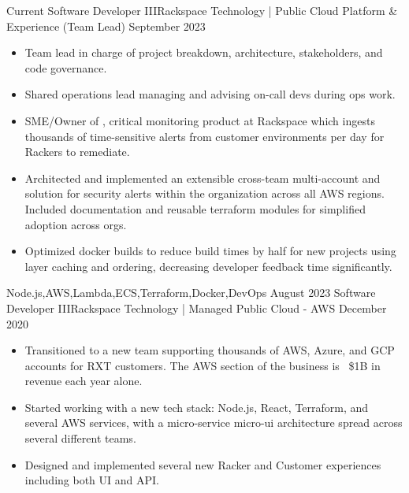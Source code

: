 \begin{experiences}
  \experience
    {Current}       {Software Developer III}{Rackspace Technology | Public Cloud Platform \& Experience (Team Lead)}
    {September 2023}{
                      \begin{itemize}
                        \item Team lead in charge of project breakdown, architecture, stakeholders, and code governance.
                        \item Shared operations lead managing and advising on-call devs during ops work.
                        \item SME/Owner of , critical monitoring product at Rackspace which ingests thousands of time-sensitive alerts from customer environments per day for Rackers to remediate.
                        \item Architected and implemented an extensible cross-team multi-account  and  solution for security alerts within the organization across all AWS regions. Included documentation and reusable terraform modules for simplified adoption across orgs.
                        \ifcv
                        \item Optimized docker builds to reduce build times by half for new projects using layer caching and ordering, decreasing developer feedback time significantly.
                        \fi
                      \end{itemize}
                    }
                    {Node.js,AWS,Lambda,ECS,Terraform,Docker,DevOps}
  \emptySeparator
  \experience
    {August 2023}   {Software Developer III}{Rackspace Technology | Managed Public Cloud - AWS}
    {December 2020} {
                      \begin{itemize}
                        \item Transitioned to a new team supporting thousands of AWS, Azure, and GCP accounts for RXT customers. The AWS section of the business is ~\$1B in revenue each year alone.
                        \item Started working with a new tech stack: Node.js, React, Terraform, and several AWS services, with a micro-service micro-ui architecture spread across several different teams.
                        \item Designed and implemented several new Racker and Customer experiences including both UI and API.

\end{itemize}}
\end{experiences}
